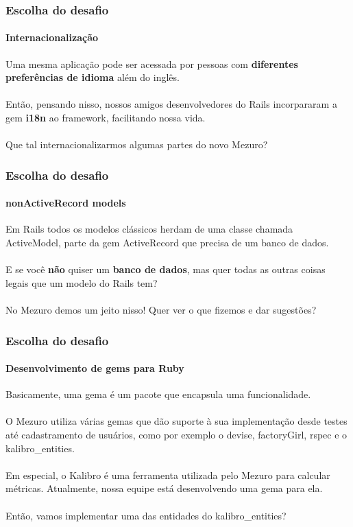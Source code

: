 \documentclass{beamer}
\begin{document}
\begin{frame}
  \frametitle{Escolha do desafio}
  \framesubtitle{Internacionalização}

  Uma mesma aplicação pode ser acessada por pessoas com \textbf{diferentes preferências de idioma} além do inglês. \\~\\

  Então, pensando nisso, nossos amigos desenvolvedores do Rails incorpararam a gem \textbf{i18n} ao framework, facilitando nossa vida. \\~\\

  Que tal internacionalizarmos algumas partes do novo Mezuro?
\end{frame}

\begin{frame}
  \frametitle{Escolha do desafio}
  \framesubtitle{nonActiveRecord models}

  Em Rails todos os modelos clássicos herdam de uma classe chamada ActiveModel, parte da gem ActiveRecord que precisa de um banco de dados. \\~\\

  E se você \textbf{não} quiser um \textbf{banco de dados}, mas quer todas as outras coisas legais que um modelo do Rails tem? \\~\\

  No Mezuro demos um jeito nisso! Quer ver o que fizemos e dar sugestões?
\end{frame}

\begin{frame}
  \frametitle{Escolha do desafio}
  \framesubtitle{Desenvolvimento de gems para Ruby}

  Basicamente, uma gema é um pacote que encapsula uma funcionalidade. \\~\\
  O Mezuro utiliza várias gemas que dão suporte à sua implementação desde testes até cadastramento de usuários, como por exemplo o devise, factoryGirl, rspec e o kalibro\_entities.\\~\\
  Em especial, o Kalibro é uma ferramenta utilizada pelo Mezuro para calcular métricas. Atualmente, nossa equipe está desenvolvendo uma gema para ela. \\~\\
  Então, vamos implementar uma das entidades do kalibro\_entities?

\end{frame}
\end{document}
